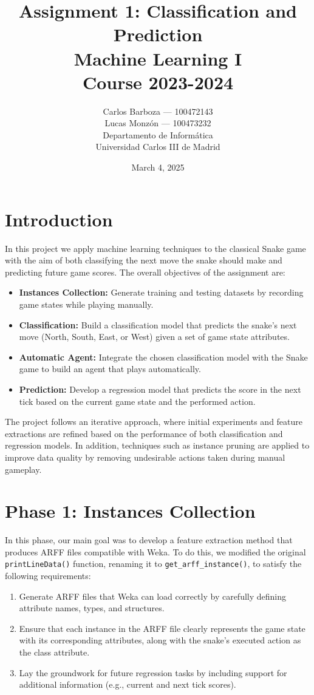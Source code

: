 \documentclass[12pt,a4paper]{article}
\title{Assignment 1: Classification and Prediction\\[1ex]
Machine Learning I\\
Course 2023-2024}
\author{Carlos Barboza --- 100472143\\
Lucas Monzón --- 100473232\\[2ex]
Departamento de Informática\\
Universidad Carlos III de Madrid}
\date{March 4, 2025}
\begin{document}
\maketitle
\thispagestyle{empty}
\newpage




\section*{Introduction}
In this project we apply machine learning techniques to the classical Snake game with the aim of both classifying the next move the snake should make and predicting future game scores. The overall objectives of the assignment are:
\begin{itemize}
    \item \textbf{Instances Collection:} Generate training and testing datasets by recording game states while playing manually.
    \item \textbf{Classification:} Build a classification model that predicts the snake's next move (North, South, East, or West) given a set of game state attributes.
    \item \textbf{Automatic Agent:} Integrate the chosen classification model with the Snake game to build an agent that plays automatically.
    \item \textbf{Prediction:} Develop a regression model that predicts the score in the next tick based on the current game state and the performed action.
\end{itemize}

The project follows an iterative approach, where initial experiments and feature extractions are refined based on the performance of both classification and regression models. In addition, techniques such as instance pruning are applied to improve data quality by removing undesirable actions taken during manual gameplay.



\newpage
\section{Phase 1: Instances Collection}

In this phase, our main goal was to develop a feature extraction method that produces ARFF files compatible with Weka. To do this, we modified the original \texttt{printLineData()} function, renaming it to \texttt{get\_arff\_instance()}, to satisfy the following requirements:

\begin{enumerate}
    \item Generate ARFF files that Weka can load correctly by carefully defining attribute names, types, and structures.
    \item Ensure that each instance in the ARFF file clearly represents the game state with its corresponding attributes, along with the snake's executed action as the class attribute.
    \item Lay the groundwork for future regression tasks by including support for additional information (e.g., current and next tick scores).
\end{enumerate}
\end{document}
